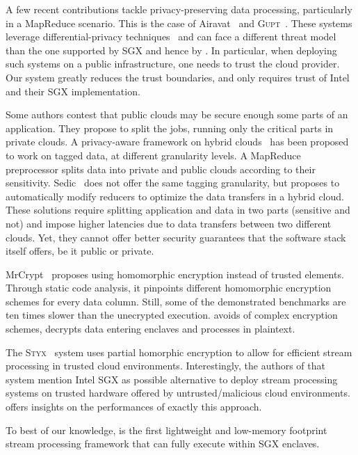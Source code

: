 A few recent contributions tackle privacy-preserving data processing, particularly in a MapReduce scenario.
This is the case of Airavat~\cite{Roy:2010:ASP:1855711.1855731} and \textsc{Gupt}~\cite{Mohan:2012:GPP:2213836.2213876}.
These systems leverage differential-privacy techniques~\cite{dwork2006calibrating} and can face a different threat model than the one supported by SGX and hence by \SYS.
In particular, when deploying such systems on a public infrastructure, one needs to trust the cloud provider.
Our system greatly reduces the trust boundaries, and only requires trust of Intel{\textregistered} and their SGX implementation.

Some authors contest that public clouds may be secure enough some parts of an application.
They propose to split the jobs, running only the critical parts in private clouds.
A privacy-aware framework on hybrid clouds~\cite{xu2015framework} has been proposed to work on tagged data, at different granularity levels.
A MapReduce preprocessor splits data into private and public clouds according to their sensitivity.
Sedic~\cite{zhang2011sedic} does not offer the same tagging granularity, but proposes to automatically modify reducers to optimize the data transfers in a hybrid cloud.
These solutions require splitting application and data in two parts (sensitive and not) and impose higher latencies due to data transfers between two different clouds.
Yet, they cannot offer better security guarantees that the software stack itself offers, be it public or private.

MrCrypt~\cite{tetali2013mrcrypt} proposes using homomorphic encryption instead of trusted elements.
Through static code analysis, it pinpoints different homomorphic encryption schemes for every data column.
Still, some of the demonstrated benchmarks are ten times slower than the unecrypted execution.
\SYS{} avoids of complex encryption schemes, decrypts data entering enclaves and processes in plaintext.

The \textsc{Styx}~\cite{Stephen:2016:SSP:2987550.2987574} system uses partial homorphic encryption to allow for efficient stream processing in trusted cloud environments.
Interestingly, the authors of that system mention Intel{\textregistered} SGX as possible alternative to deploy stream processing systems on trusted hardware offered by untrusted/malicious cloud environments.
\SYS{} offers insights on the performances of exactly this approach.

To best of our knowledge, \SYS{} is the first lightweight and low-memory footprint stream processing framework that can fully execute within SGX enclaves.

